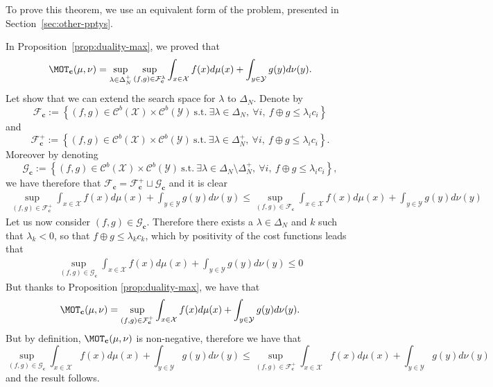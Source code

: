 To prove this theorem, we use an equivalent form of the problem, presented in Section~\ref{sec:other-pptys}. 
\begin{prv*}
In Proposition~\ref{prop:duality-max}, we  proved that 
$$\MOT_{\mathbf{c}}(\mu,\nu) =\sup_{\lambda\in\Delta^+_N} \sup\limits_{(f,g)\in\mathcal{F}_{\mathbf{c}}^{\lambda}}\int_{x\in\mathcal{X}} f(x)d\mu(x)+ \int_{y\in\mathcal{Y}} g(y)d\nu(y).$$ 
Let show that we can extend the search space for $\lambda$ to $\Delta_N$. Denote by $$\mathcal{F}_{\mathbf{c}}:=\left\{(f,g)\in\mathcal{C}^b(\mathcal{X})\times \mathcal{C}^b(\mathcal{Y})~\mathrm{s.t.}~\exists\lambda\in\Delta_N,~\forall i,~f\oplus g\leq \lambda_i c_i\right\}$$
and 
$$\mathcal{F}_{\mathbf{c}}^+:=\left\{(f,g)\in\mathcal{C}^b(\mathcal{X})\times \mathcal{C}^b(\mathcal{Y})~\mathrm{s.t.}~\exists\lambda\in\Delta^+_N,~\forall i,~f\oplus g\leq \lambda_i c_i\right\}.$$
Moreover by denoting 
$$\mathcal{G}_{\mathbf{c}}:=\left\{(f,g)\in\mathcal{C}^b(\mathcal{X})\times \mathcal{C}^b(\mathcal{Y})~\mathrm{s.t.}~\exists\lambda\in\Delta_N\setminus\Delta_N^{+} ,~\forall i,~f\oplus g\leq \lambda_i c_i\right\},$$
we have therefore that $\mathcal{F}_{\mathbf{c}}= \mathcal{F}_{\mathbf{c}}^+\sqcup \mathcal{G}_{\mathbf{c}}$
and it is clear
\begin{align*}
   \sup\limits_{(f,g)\in\mathcal{F}_{\mathbf{c}}^+}\int_{x\in\mathcal{X}} f(x)d\mu(x)+ \int_{y\in\mathcal{Y}} g(y)d\nu(y)\leq  \sup\limits_{(f,g)\in\mathcal{F}_{\mathbf{c}}}\int_{x\in\mathcal{X}} f(x)d\mu(x)+ \int_{y\in\mathcal{Y}} g(y)d\nu(y)
\end{align*}
Let us now consider $(f,g)\in \mathcal{G}_{\mathbf{c}}$. Therefore  there exists a $\lambda\in\Delta_N$ and $k$ such that $\lambda_k< 0$, so that $f \oplus g\leq \lambda_k c_k$, which by positivity of the cost functions leads that 
\begin{align}
    \sup\limits_{(f,g)\in\mathcal{G}_{\mathbf{c}}}\int_{x\in\mathcal{X}} f(x)d\mu(x)+ \int_{y\in\mathcal{Y}} g(y)d\nu(y)\leq 0
\end{align}
But thanks to Proposition \ref{prop:duality-max}, we have that
$$\MOT_{\mathbf{c}}(\mu,\nu)= \sup\limits_{(f,g)\in\mathcal{F}_{\mathbf{c}}^+}\int_{x\in\mathcal{X}} f(x)d\mu(x)+ \int_{y\in\mathcal{Y}} g(y)d\nu(y).$$
But by definition, $\MOT_{\mathbf{c}}(\mu,\nu)$ is non-negative, therefore we have that 
$$ \sup\limits_{(f,g)\in\mathcal{G}_{\mathbf{c}}}\int_{x\in\mathcal{X}} f(x)d\mu(x)+ \int_{y\in\mathcal{Y}} g(y)d\nu(y)\leq  \sup\limits_{(f,g)\in\mathcal{F}_{\mathbf{c}}^+}\int_{x\in\mathcal{X}} f(x)d\mu(x)+ \int_{y\in\mathcal{Y}} g(y)d\nu(y)$$
and the result follows.





\end{prv*}
